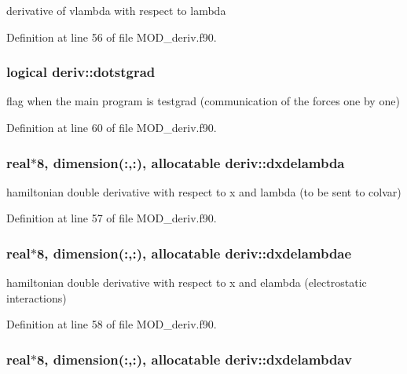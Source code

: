 derivative of vlambda with respect to lambda 



Definition at line 56 of file M\-O\-D\-\_\-deriv.\-f90.

\hypertarget{classderiv_af350f0fc69097554ec61246320c44a11}{
\subsubsection[{dotstgrad}]{\setlength{\rightskip}{0pt plus 5cm}logical deriv\-::dotstgrad}}\label{classderiv_af350f0fc69097554ec61246320c44a11}


flag when the main program is testgrad (communication of the forces one by one) 



Definition at line 60 of file M\-O\-D\-\_\-deriv.\-f90.

\hypertarget{classderiv_a61835c05c9b422286679e70d540c6f4a}{
\subsubsection[{dxdelambda}]{\setlength{\rightskip}{0pt plus 5cm}real$\ast$8, dimension(\-:,\-:), allocatable deriv\-::dxdelambda}}\label{classderiv_a61835c05c9b422286679e70d540c6f4a}


hamiltonian double derivative with respect to x and lambda (to be sent to colvar) 



Definition at line 57 of file M\-O\-D\-\_\-deriv.\-f90.

\hypertarget{classderiv_a3205c0909e4a054b12d6b5f2366e182e}{
\subsubsection[{dxdelambdae}]{\setlength{\rightskip}{0pt plus 5cm}real$\ast$8, dimension(\-:,\-:), allocatable deriv\-::dxdelambdae}}\label{classderiv_a3205c0909e4a054b12d6b5f2366e182e}


hamiltonian double derivative with respect to x and elambda (electrostatic interactions) 



Definition at line 58 of file M\-O\-D\-\_\-deriv.\-f90.

\hypertarget{classderiv_a883c736eaa7d19c7c1cf277d532660b7}{
\subsubsection[{dxdelambdav}]{\setlength{\rightskip}{0pt plus 5cm}real$\ast$8, dimension(\-:,\-:), allocatable deriv\-::dxdelambdav}}\label{classderiv_a883c736eaa7d19c7c1cf277d532660b7}


